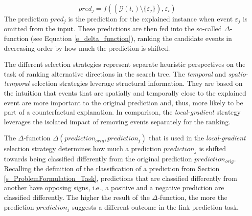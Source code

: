 \begin{itemize}
    \begin{equation}
        pred_j = f((\mathcal{G}(t_i) \setminus \{\varepsilon_j\}), \varepsilon_i)
    \end{equation}
    The prediction $pred_j$ is the prediction for the explained instance when event $\varepsilon_j$ is omitted from the input. These predictions are then fed into the so-called $\Delta$-function (see Equation \ref{e_delta_function}), ranking the candidate events in decreasing order by how much the prediction is shifted.
    
\end{itemize}

The different selection strategies represent separate heuristic perspectives on the task of ranking alternative directions in the search tree. The \textit{temporal} and \textit{spatio-temporal} selection strategies leverage structural information. They are based on the intuition that events that are spatially and temporally close to the explained event are more important to the original prediction and, thus, more likely to be part of a counterfactual explanation. In comparison, the \textit{local-gradient} strategy leverages the isolated impact of removing events separately for the ranking.

The $\Delta$-function $\Delta(prediction_{orig}, prediction_j)$ that is used in the \textit{local-gradient} selection strategy determines how much a prediction $prediction_j$ is shifted towards being classified differently from the original prediction $prediction_{orig}$. Recalling the definition of the classification of a prediction from Section \ref{s_ProblemFormulation_Task}, predictions that are classified differently from another have opposing signs, i.e., a positive and a negative prediction are classified differently. The higher the result of the $\Delta$-function, the more the prediction $prediction_j$ suggests a different outcome in the link prediction task.

